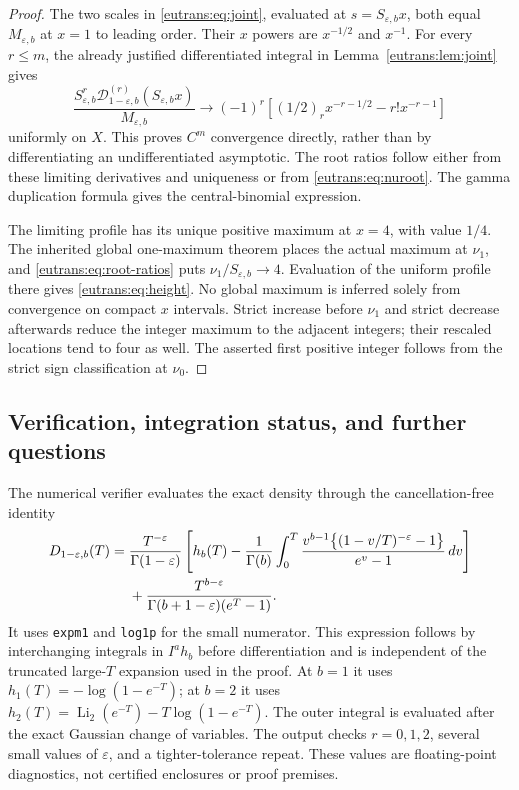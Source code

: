 \begin{proof}
The two scales in \eqref{eutrans:eq:joint}, evaluated at
$s=S_{\varepsilon,b}x$, both equal $M_{\varepsilon,b}$ at $x=1$
to leading order. Their $x$ powers are $x^{-1/2}$ and $x^{-1}$.
For every $r\leq m$, the already justified differentiated integral
in Lemma~\ref{eutrans:lem:joint} gives
\[
 \frac{S_{\varepsilon,b}^r
             \mathcal D_{1-\varepsilon,b}^{(r)}
                        (S_{\varepsilon,b}x)}{M_{\varepsilon,b}}
 \longrightarrow(-1)^r\left[
     (1/2)_r x^{-r-1/2}-r!x^{-r-1}\right]
\]
uniformly on $X$. This proves $C^m$ convergence directly, rather than
by differentiating an undifferentiated asymptotic. The root ratios
follow either from these limiting derivatives and uniqueness or
from \eqref{eutrans:eq:nuroot}. The gamma duplication formula gives
the central-binomial expression.

The limiting profile has its unique positive maximum at $x=4$, with
value $1/4$. The inherited global one-maximum theorem places the
actual maximum at $\nu_1$, and \eqref{eutrans:eq:root-ratios} puts
$\nu_1/S_{\varepsilon,b}\to4$. Evaluation of the uniform profile
there gives \eqref{eutrans:eq:height}. No global maximum is inferred
solely from convergence on compact $x$ intervals.
Strict increase before $\nu_1$ and strict decrease afterwards reduce
the integer maximum to the adjacent integers; their rescaled
locations tend to four as well. The asserted first positive integer
follows from the strict sign classification at $\nu_0$.
\end{proof}

\subsection{Verification, integration status, and further questions}

The numerical verifier evaluates the exact density through the
cancellation-free identity
\begin{align}\label{eutrans:eq:numerical-density}
 D_{1-\varepsilon,b}(T)
 ={}&\frac{T^{-\varepsilon}}{\Gamma(1-\varepsilon)}
  \left[h_b(T)-\frac1{\Gamma(b)}\int_0^T
   \frac{v^{b-1}\bigl\{(1-v/T)^{-\varepsilon}-1\bigr\}}
        {e^v-1}\,dv\right]\notag\\
 &+\frac{T^{b-\varepsilon}}{\Gamma(b+1-\varepsilon)(e^T-1)}.
\end{align}
It uses \texttt{expm1} and \texttt{log1p} for the small numerator.
This expression follows by interchanging integrals in $I^ah_b$
before differentiation and is independent of the truncated large-$T$
expansion used in the proof. At $b=1$ it uses
$h_1(T)=-\log(1-e^{-T})$; at $b=2$ it uses
$h_2(T)=\operatorname{Li}_2(e^{-T})-T\log(1-e^{-T})$.
The outer integral is evaluated after the exact Gaussian change of
variables. The output checks $r=0,1,2$, several small values of
$\varepsilon$, and a tighter-tolerance repeat. These values are
floating-point diagnostics, not certified enclosures or proof premises.

